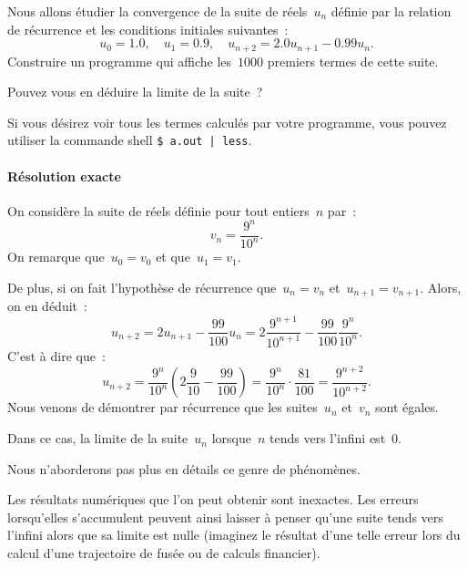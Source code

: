 \begin{exercice}
  \label{sec:SuiteRecurrenteInstable}
  Nous allons \'etudier la  convergence de la suite de r\'eels~$u_{n}$
  d\'efinie  par la  relation    de  r\'ecurrence et les    conditions
  initiales suivantes~:
  $$
  u_{0} = 1.0, \quad  u_{1} = 0.9, \quad
  u_{n+2} = 2.0 u_{n+1} - 0.99 u_{n}.
  $$
  Construire un programme qui affiche les~$1000$ premiers termes de cette
  suite.
  \par
  Pouvez vous en d\'eduire la limite de la suite~?
  \par
  Si vous d\'esirez  voir   tous   les  termes calcul\'es   par   votre
  programme, vous  pouvez utiliser la  commande  shell \texttt{\$~a.out |
    less}.
  \ifcorrection
  \begin{correction}
    
  \end{correction}
  \fi
  \label{ResolutionExacte}
  \paragraph{R\'esolution exacte}
  On consid\`ere la suite de  r\'eels d\'efinie pour tout  entiers~$n$
  par~:
  \begin{equation}
    \label{eq:FormeExacte}
    v_{n} = \frac{9^{n}}{10^{n}}.
  \end{equation}
  On remarque que~${u_{0}=v_{0}}$ et que~${u_{1}=v_{1}}$.
  \par
  De   plus,   si    on    fait     l'hypoth\`ese  de     r\'ecurrence
  que~${u_{n}=v_{n}}$ et~${u_{n+1}=v_{n+1}}$.  Alors, on en d\'eduit~:
  $$
  u_{n+2}   =  2      u_{n+1}    -  \frac{99}{100}    u_{n}    =
  2\frac{9^{n+1}}{10^{n+1}} - \frac{99}{100}\frac{9^{n}}{10^{n}}.
  $$
  C'est \`a dire que~:
  $$
  u_{n+2}  =  \frac{9^{n}}{10^{n}}(2\frac{9}{10} - \frac{99}{100})
  =\frac{9^{n}}{10^{n}}\cdot\frac{81}{100} = \frac{9^{n+2}}{10^{n+2}}.
  $$
  Nous venons de  d\'emontrer par r\'ecurrence  que les suites~$u_{n}$
  et~$v_{n}$ sont \'egales.
  \par
  Dans ce  cas, la limite de  la suite~$u_{n}$  lorsque~$n$ tends vers
  l'infini est~$0$.
  \par
  Nous n'aborderons pas plus en d\'etails ce genre de ph\'enom\`enes.
  \par
  Les r\'esultats num\'eriques  que l'on peut  obtenir sont inexactes. 
  Les  erreurs  lorsqu'elles s'accumulent peuvent   ainsi laisser  \`a
  penser qu'une  suite  tends vers l'infini   alors que sa limite  est
  nulle   (imaginez le r\'esultat d'une   telle erreur  lors du calcul
  d'une trajectoire de fus\'ee ou de calculs financier).
\end{exercice}

